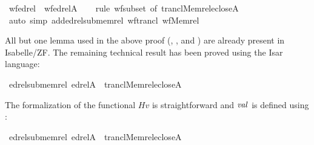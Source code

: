 \begin{isabelle}
\isamarkupfalse%
\ wf{\isacharunderscore}edrel\ {\isacharcolon}\ {\isachardoublequoteopen}wf{\isacharparenleft}edrel{\isacharparenleft}A{\isacharparenright}{\isacharparenright}{\isachardoublequoteclose}\isanewline
\ \ \isamarkupfalse%
\ {\isacharparenleft}rule\ wf{\isacharunderscore}subset\ {\isacharbrackleft}of\ {\isachardoublequoteopen}trancl{\isacharparenleft}Memrel{\isacharparenleft}eclose{\isacharparenleft}A{\isacharparenright}{\isacharparenright}{\isacharparenright}{\isachardoublequoteclose}{\isacharbrackright}{\isacharparenright}\isanewline
\ \ \isamarkupfalse%
\ {\isacharparenleft}auto\ simp\ add{\isacharcolon}edrel{\isacharunderscore}sub{\isacharunderscore}memrel\ wf{\isacharunderscore}trancl\ wf{\isacharunderscore}Memrel{\isacharparenright}\isanewline
\ \ \isamarkupfalse%
%
\end{isabelle}
%
All but one lemma used in the above proof
(,
, and
) are already
present in Isabelle/ZF. The remaining technical result has
been proved using the Isar language:
%
\begin{isabelle}
\isamarkupfalse%
\ edrel{\isacharunderscore}sub{\isacharunderscore}memrel{\isacharcolon}\ {\isachardoublequoteopen}edrel{\isacharparenleft}A{\isacharparenright}\ {\isasymsubseteq}\ trancl{\isacharparenleft}Memrel{\isacharparenleft}eclose{\isacharparenleft}A{\isacharparenright}{\isacharparenright}{\isacharparenright}{\isachardoublequoteclose}
\end{isabelle}

The formalization of the functional $\mathit{Hv}$ is straightforward and $\operatorname{\mathit{val}}$ is defined using :
%
\begin{isabelle}
\isamarkupfalse%
\ edrel{\isacharunderscore}sub{\isacharunderscore}memrel{\isacharcolon}\ {\isachardoublequoteopen}edrel{\isacharparenleft}A{\isacharparenright}\ {\isasymsubseteq}\ trancl{\isacharparenleft}Memrel{\isacharparenleft}eclose{\isacharparenleft}A{\isacharparenright}{\isacharparenright}{\isacharparenright}{\isachardoublequoteclose}
\end{isabelle}

